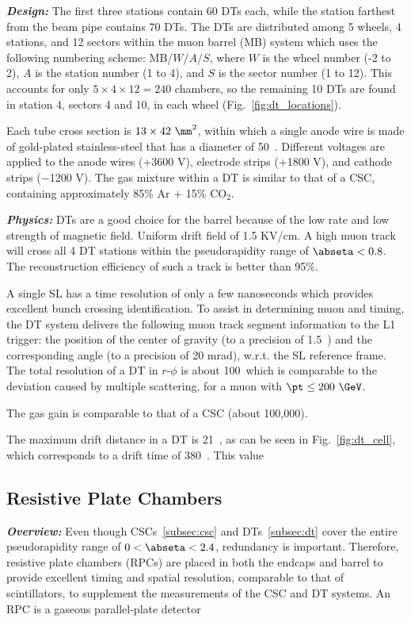 \textbf{\textit{Design:}}
The first three stations contain 60 DTs each, while the station farthest from the beam pipe contains 70 DTs.
The DTs are distributed among 5 wheels, 4 stations, and 12 sectors within the muon barrel (MB) system which uses the following numbering scheme:
MB/$W$/$A$/$S$,
where $W$ is the wheel number (-2 to 2),
$A$ is the station number (1 to 4),
and $S$ is the sector number (1 to 12).
This accounts for only $5 \times 4 \times 12 = 240$ chambers, so the remaining 10 DTs are found in station 4, sectors 4 and 10, in each wheel (Fig.~\ref{fig:dt_locations}).

Each tube cross section is $13 \times 42~\mm^{2}$, within which a single anode wire is made of gold-plated stainless-steel that has a diameter of 50~\mum.
Different voltages are applied to the anode wires ($+$3600 V), electrode strips ($+$1800 V), and cathode strips ($-$1200 V).
The gas mixture within a DT is similar to that of a CSC, containing approximately 85\% Ar $+$ 15\% CO$_{2}$.

\textbf{\textit{Physics:}}
DTs are a good choice for the barrel because of the low rate and low strength of magnetic field.
Uniform drift field of 1.5 KV/cm.
A high \pt muon track will cross all 4 DT stations within the pseudorapidity range of $\abseta < 0.8$.
The reconstruction efficiency of such a track is better than 95\%.

A single SL has a time resolution of only a few nanoseconds which provides excellent bunch crossing identification.
To assist in determining muon \pt and timing, the DT system delivers the following muon track segment information to the L1 trigger:
the position of the center of gravity (to a precision of 1.5~\mm) and the corresponding angle (to a precision of 20 mrad), w.r.t. the SL reference frame.
The total resolution of a DT in $r$-$\phi$ is about 100~\mum which is comparable to the deviation caused by multiple scattering, for a muon with $\pt \le 200~\GeV$.

The gas gain is comparable to that of a CSC (about 100,000).

The maximum drift distance in a DT is 21~\mm, as can be seen in Fig.~\ref{fig:dt_cell}, which corresponds to a drift time of 380~\ns.
This value 

\subsection{Resistive Plate Chambers}
\label{subsec:rpc}

\textbf{\textit{Overview:}}
Even though CSCs~\ref{subsec:csc} and DTs~\ref{subsec:dt} cover the entire pseudorapidity range of $0 < \abseta < 2.4$, redundancy is important.
Therefore, resistive plate chambers (RPCs) are placed in both the endcaps and barrel to provide excellent timing and spatial resolution, comparable to that of scintillators, to supplement the measurements of the CSC and DT systems.
An RPC is a gaseous parallel-plate detector

